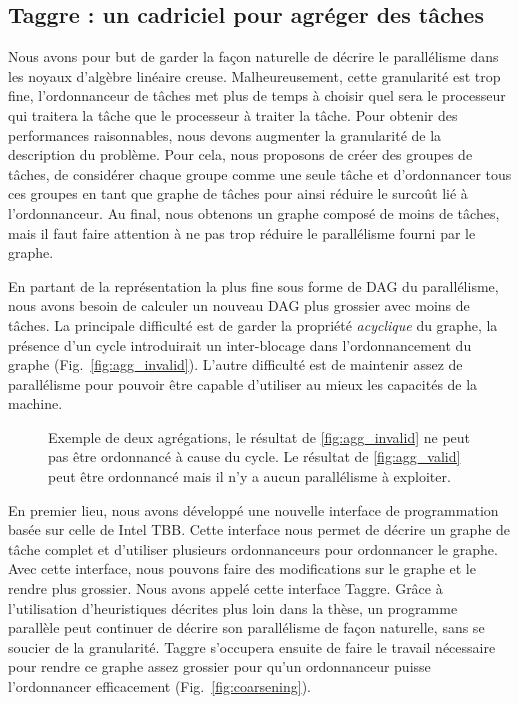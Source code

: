 \subsection{Taggre : un cadriciel pour agréger des tâches}
Nous avons pour but de garder la façon naturelle de décrire le parallélisme dans les noyaux d'algèbre linéaire creuse.
%
Malheureusement, cette granularité est trop fine, l'ordonnanceur de tâches met plus de temps à choisir quel sera le processeur qui traitera la tâche que le processeur à traiter la tâche.
%
Pour obtenir des performances raisonnables, nous devons augmenter la granularité de la description du problème.
%
Pour cela, nous proposons de créer des groupes de tâches, de considérer chaque groupe comme une seule tâche et d'ordonnancer tous ces groupes en tant que graphe de tâches pour ainsi réduire le surcoût lié à l'ordonnanceur.
%
Au final, nous obtenons un graphe composé de moins de tâches, mais il faut faire attention à ne pas trop réduire le parallélisme fourni par le graphe.


En partant de la représentation la plus fine sous forme de DAG du parallélisme, nous avons besoin de calculer un nouveau DAG plus grossier avec moins de tâches.
%
La principale difficulté est de garder la propriété {\em acyclique} du graphe, la présence d'un cycle introduirait un inter-blocage dans l'ordonnancement du graphe (Fig.~\ref{fig:agg_invalid}).
%
L'autre difficulté est de maintenir assez de parallélisme pour pouvoir être capable d'utiliser au mieux les capacités de la machine.

\begin{figure}[!ht]
     \begin{center}
        \hspace{0.15\textwidth}%
    \end{center}
    \caption{Exemple de deux agrégations, le résultat de \ref{fig:agg_invalid} ne peut pas être ordonnancé à cause du cycle. Le résultat de \ref{fig:agg_valid} peut être ordonnancé mais il n'y a aucun parallélisme à exploiter.}
    \label{fig:agg_basic}
\end{figure}

En premier lieu, nous avons développé une nouvelle interface de programmation basée sur celle de Intel TBB.
%
Cette interface nous permet de décrire un graphe de tâche complet et d'utiliser plusieurs ordonnanceurs pour ordonnancer le graphe.
%
Avec cette interface, nous pouvons faire des modifications sur le graphe et le rendre plus grossier.
%
Nous avons appelé cette interface Taggre.
%
Grâce à l'utilisation d'heuristiques décrites plus loin dans la thèse, un programme parallèle peut continuer de décrire son parallélisme de façon naturelle, sans se soucier de la granularité.
%
Taggre s'occupera ensuite de faire le travail nécessaire pour rendre ce graphe assez grossier pour qu'un ordonnanceur puisse l'ordonnancer efficacement (Fig.~\ref{fig:coarsening}).

